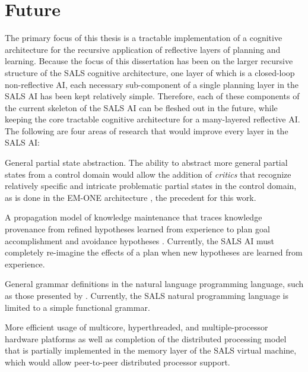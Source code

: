 \chapter{Future}\label{chapter:future}

The primary focus of this thesis is a tractable implementation of a
cognitive architecture for the recursive application of reflective
layers of planning and learning.  Because the focus of this
dissertation has been on the larger recursive structure of the SALS
cognitive architecture, one layer of which is a closed-loop
non-reflective AI, each necessary sub-component of a single planning
layer in the SALS AI has been kept relatively simple.  Therefore, each
of these components of the current skeleton of the SALS AI can be
fleshed out in the future, while keeping the core tractable cognitive
architecture for a many-layered reflective AI.  The following are four
areas of research that would improve every layer in the SALS AI:
\begin{packed_enumerate}
\item{General partial state abstraction.  The ability to abstract more
  general partial states from a control domain would allow the
  addition of {\emph{critics}} that recognize relatively specific and
  intricate problematic partial states in the control domain, as is
  done in the EM-ONE architecture \cite[]{singh:2005b}, the precedent
  for this work.}
\item{A propagation model of knowledge maintenance that traces
  knowledge provenance from refined hypotheses learned from experience
  to plan goal accomplishment and avoidance hypotheses
  \cite[]{radul:2009}.  Currently, the SALS AI must completely
  re-imagine the effects of a plan when new hypotheses are learned
  from experience.}
\item{General grammar definitions in the natural language programming
  language, such as those presented by \cite{winograd:1970}.
  Currently, the SALS natural programming language is limited to a
  simple functional grammar.}
\item{More efficient usage of multicore, hyperthreaded, and
  multiple-processor hardware platforms as well as completion of the
  distributed processing model that is partially implemented in the
  memory layer of the SALS virtual machine, which would allow
  peer-to-peer distributed processor support.}
\end{packed_enumerate}
